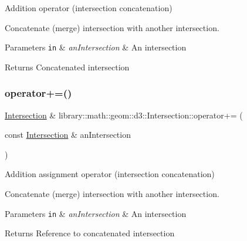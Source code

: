 Addition operator (intersection concatenation) 

Concatenate (merge) intersection with another intersection.


\begin{DoxyParams}[1]{Parameters}
\mbox{\tt in}  & {\em an\+Intersection} & An intersection \\
\hline
\end{DoxyParams}
\begin{DoxyReturn}{Returns}
Concatenated intersection 
\end{DoxyReturn}
\mbox{\label{classlibrary_1_1math_1_1geom_1_1d3_1_1_intersection_a849f98c4b51f792a93c64fc6dedbce50}} 
\subsubsection{\texorpdfstring{operator+=()}{operator+=()}}
{\footnotesize\ttfamily \hyperlink{classlibrary_1_1math_1_1geom_1_1d3_1_1_intersection}{Intersection} \& library\+::math\+::geom\+::d3\+::\+Intersection\+::operator+= (\begin{DoxyParamCaption}\item[{const \hyperlink{classlibrary_1_1math_1_1geom_1_1d3_1_1_intersection}{Intersection} \&}]{an\+Intersection }\end{DoxyParamCaption})}



Addition assignment operator (intersection concatenation) 

Concatenate (merge) intersection with another intersection.


\begin{DoxyParams}[1]{Parameters}
\mbox{\tt in}  & {\em an\+Intersection} & An intersection \\
\hline
\end{DoxyParams}
\begin{DoxyReturn}{Returns}
Reference to concatenated intersection 
\end{DoxyReturn}
\mbox{\label{classlibrary_1_1math_1_1geom_1_1d3_1_1_intersection_a41ca5e5ac6fe7bc3f26f516acde56be8}} 
